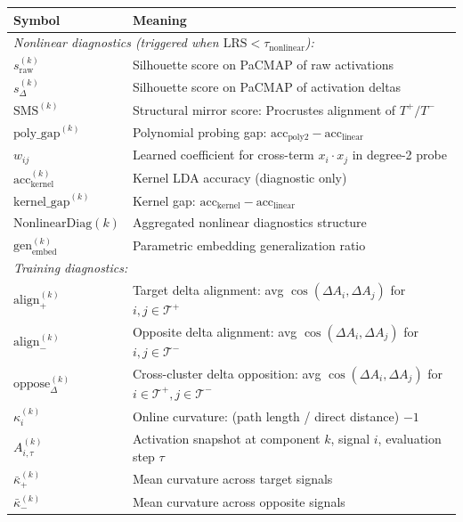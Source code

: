 \documentclass[11pt]{article}
\begin{document}
\begin{center}
\begin{tabular}{ll}
\toprule
\textbf{Symbol} & \textbf{Meaning} \\
\midrule
\multicolumn{2}{l}{\textit{Nonlinear diagnostics (triggered when $\text{LRS} < \tau_{\text{nonlinear}}$):}} \\
$s_{\text{raw}}^{(k)}$ & Silhouette score on PaCMAP of raw activations \\
$s_{\Delta}^{(k)}$ & Silhouette score on PaCMAP of activation deltas \\
$\text{SMS}^{(k)}$ & Structural mirror score: Procrustes alignment of $T^+/T^-$ \\
$\text{poly\_gap}^{(k)}$ & Polynomial probing gap: $\text{acc}_{\text{poly2}} - \text{acc}_{\text{linear}}$ \\
$w_{ij}$ & Learned coefficient for cross-term $x_i \cdot x_j$ in degree-2 probe \\
$\text{acc}_{\text{kernel}}^{(k)}$ & Kernel LDA accuracy (diagnostic only) \\
$\text{kernel\_gap}^{(k)}$ & Kernel gap: $\text{acc}_{\text{kernel}} - \text{acc}_{\text{linear}}$ \\
$\text{NonlinearDiag}(k)$ & Aggregated nonlinear diagnostics structure \\
$\text{gen}_{\text{embed}}^{(k)}$ & Parametric embedding generalization ratio \\
\midrule
\multicolumn{2}{l}{\textit{Training diagnostics:}} \\
$\text{align}^{(k)}_+$ & Target delta alignment: avg $\cos(\Delta A_i, \Delta A_j)$ for $i,j \in \mathcal{T}^+$ \\
$\text{align}^{(k)}_-$ & Opposite delta alignment: avg $\cos(\Delta A_i, \Delta A_j)$ for $i,j \in \mathcal{T}^-$ \\
$\text{oppose}^{(k)}_\Delta$ & Cross-cluster delta opposition: avg $\cos(\Delta A_i, \Delta A_j)$ for $i \in \mathcal{T}^+, j \in \mathcal{T}^-$ \\
$\kappa^{(k)}_i$ & Online curvature: (path length / direct distance) $- 1$ \\
$A^{(k)}_{i,\tau}$ & Activation snapshot at component $k$, signal $i$, evaluation step $\tau$ \\
$\bar{\kappa}^{(k)}_+$ & Mean curvature across target signals \\
$\bar{\kappa}^{(k)}_-$ & Mean curvature across opposite signals \\
\bottomrule
\end{tabular}
\end{center}
\end{document}
